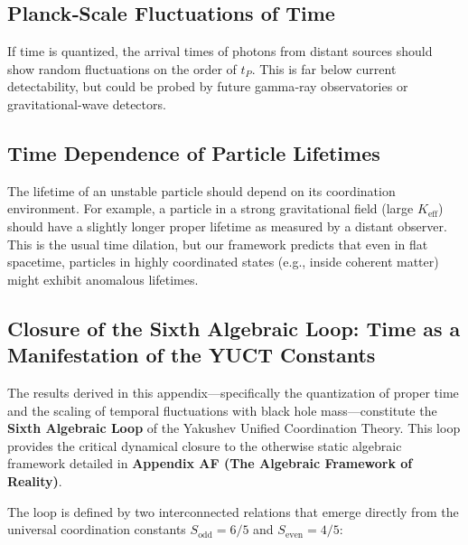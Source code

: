 \documentclass[12pt,a4paper]{article}
\newcommand{\Keff}{K_{\mathrm{eff}}}
\begin{document}
	\subsection{Planck‑Scale Fluctuations of Time}
	
	If time is quantized, the arrival times of photons from distant sources should show random fluctuations on the order of \(t_P\). This is far below current detectability, but could be probed by future gamma‑ray observatories or gravitational‑wave detectors.
	
	\subsection{Time Dependence of Particle Lifetimes}
	
	The lifetime of an unstable particle should depend on its coordination environment. For example, a particle in a strong gravitational field (large \(\Keff\)) should have a slightly longer proper lifetime as measured by a distant observer. This is the usual time dilation, but our framework predicts that even in flat spacetime, particles in highly coordinated states (e.g., inside coherent matter) might exhibit anomalous lifetimes.
	
	\subsection{Closure of the Sixth Algebraic Loop: Time as a Manifestation of the YUCT Constants}
	
	The results derived in this appendix—specifically the quantization of proper time and the scaling of temporal fluctuations with black hole mass—constitute the \textbf{Sixth Algebraic Loop} of the Yakushev Unified Coordination Theory. This loop provides the critical dynamical closure to the otherwise static algebraic framework detailed in \textbf{Appendix AF (The Algebraic Framework of Reality)}.
	
	The loop is defined by two interconnected relations that emerge directly from the universal coordination constants \(S_{\mathrm{odd}} = 6/5\) and \(S_{\mathrm{even}} = 4/5\):
	
\end{document}
